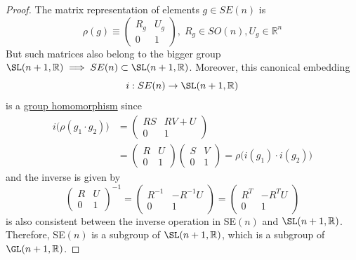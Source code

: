   \begin{proof}
    The matrix representation of elements $g \in SE(n)$ is 
    \begin{equation}
      \rho(g) \equiv \begin{pmatrix}
      R_g & U_g \\ 0 & 1
      \end{pmatrix}, \; R_g \in SO(n), U_g \in \mathbb{R}^n
    \end{equation}
    But such matrices also belong to the bigger group $\SL(n+1, \mathbb{R}) \implies SE(n) \subset \SL(n+1, \mathbb{R})$. Moreover, this canonical embedding 
    \begin{equation}
      i: SE(n) \rightarrow \SL(n+1, \mathbb{R})
    \end{equation}
    is a \hyperref[def:group-homomorphism]{group homomorphism} since
    \begin{align*}
      i\big( \rho(g_1 \cdot g_2) \big) & = \begin{pmatrix}
      RS & RV + U \\ 0 & 1
      \end{pmatrix} \\
      & = \begin{pmatrix}
      R & U \\ 0 & 1
      \end{pmatrix} \begin{pmatrix}
      S & V \\ 0 & 1
      \end{pmatrix} = \rho \big( i(g_1) \cdot i(g_2) \big) 
    \end{align*}
    and the inverse is given by 
    \begin{equation}
      \begin{pmatrix}
      R & U \\ 0 & 1
      \end{pmatrix}^{-1} = \begin{pmatrix}
      R^{-1} & - R^{-1} U \\ 0 & 1
      \end{pmatrix} = \begin{pmatrix}
      R^T & - R^T U \\ 0 & 1
      \end{pmatrix}
    \end{equation}
    is also consistent between the inverse operation in SE$(n)$ and $\SL(n+1, \mathbb{R})$. Therefore, SE$(n)$ is a subgroup of $\SL(n+1, \mathbb{R})$, which is a subgroup of $\GL(n+1, \mathbb{R})$. 
  \end{proof}

